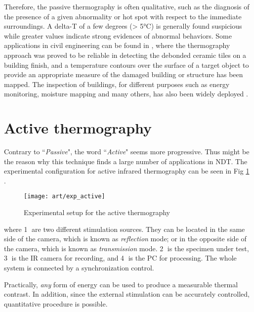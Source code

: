 Therefore, the passive thermography is often qualitative, such as the diagnosis of the presence of a given abnormality or hot spot with respect to the immediate surroundings.  A delta-T of a few degrees (> 5°C) is generally
found suspicious while greater values indicate strong evidences of abnormal behaviors. Some applications in civil engineering can be found in \citep{2000-Li,stanley1994non,lo2004building}, where the thermography approach was proved to be reliable in detecting the debonded ceramic tiles on a building finish, and a temperature contours over the surface of a target object to provide an appropriate measure of the damaged building or structure has been mapped. The inspection of buildings, for different purposes such as energy monitoring, moisture mapping and many others, has also been widely deployed \citep{laranjeirapassive,bison1993automatic,bison2012geometrical}. 

\section{Active thermography}
Contrary to ``\textit{Passive}", the word ``\textit{Active}" seems more progressive. Thus might be the reason why this technique finds a large number of applications in NDT. The experimental configuration for active infrared thermography can be seen in Fig \ref{exp_active} \citep{sfarra2010comparative}. 
\begin{figure}[!htbp]
	\centering
	\texttt{[image: art/exp\_active]}
	\caption{Experimental setup for the active thermography}
	\label{exp_active}
\end{figure}
where \textcircled{1} are two different stimulation sources. They can be located in the same side of the camera, which is known as \textit{reflection} mode; or in the opposite side of the camera, which is known as \textit{transmission} mode.  \textcircled{2} is the specimen under test, \textcircled{3} is the IR camera for recording, and \textcircled{4} is the PC for processing. The whole system is connected by a synchronization control.

Practically, \textit{any} form of energy can be used to produce a measurable thermal contrast. In addition, since the external stimulation can be accurately controlled, quantitative procedure is possible. 

